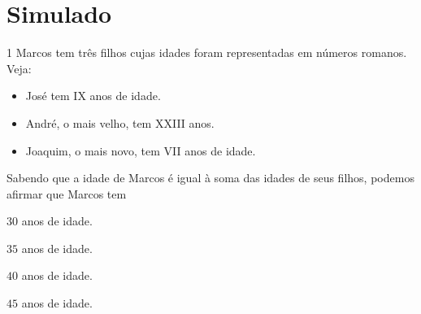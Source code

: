 
%




\chapter[Simulado 2]{Simulado}

\num{1}  Marcos tem três filhos cujas idades foram representadas em números
romanos. Veja:

\begin{itemize}
\item
  José tem IX anos de idade.
\item
  André, o mais velho, tem XXIII anos.
\item
  Joaquim, o mais novo, tem VII anos de idade.
\end{itemize}

Sabendo que a idade de Marcos é igual à soma das idades de seus
filhos, podemos afirmar que Marcos tem

\begin{escolha}
\item $30$ anos de idade.
\item $35$ anos de idade.
\item $40$ anos de idade.
\item $45$ anos de idade.
\end{escolha}

